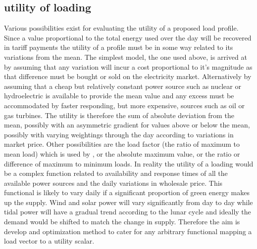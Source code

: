 \documentclass[a4paper, 10 pt, conference]{ieeeconf}  %
\begin{document}
\subsection{utility of loading}
Various possibilities exist for evaluating the utility of a proposed load profile. Since a value proportional to the total energy used over the day will be recovered in tariff payments the utility of a profile must be in some way related to its variations from the mean. The simplest model, the one used above, is arrived at by assuming that any variation will incur a cost proportional to it's magnitude as that difference must be bought or sold on the electricity market. Alternatively by assuming that a cheap but relatively constant power source such as nuclear or hydroelectric is available to provide the mean value and any excess must be accommodated by faster responding, but more expensive, sources such as oil or gas turbines. The utility is therefore the sum of absolute deviation from the mean, possibly with an asymmetric gradient for values above or below the mean, possibly with varying weightings through the day according to variations in market price.
Other possibilities are the load factor (the ratio of maximum to mean load) which is used by \cite{ramchurn2011agent}, or the absolute maximum value, or the ratio or difference of maximum to minimum loads. In reality the utility of a loading would be a complex function related to availability and response times of all the available power sources and the daily variations in wholesale price. This functional is likely to vary daily if a significant proportion of green energy makes up the supply. Wind and solar power will vary significantly from day to day while tidal power will have a gradual trend according to the lunar cycle and ideally the demand would be shifted to match the change in supply. Therefore the aim is develop and optimization method to cater for any arbitrary functional mapping a load vector to a utility scalar.
\end{document}
